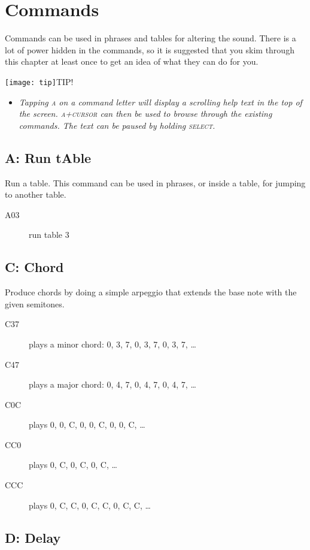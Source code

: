 \chapter{Commands}

Commands can be used in phrases and tables for altering the sound. There is a lot of power hidden in the commands, so it is suggested that you skim through this chapter at least once to get an idea of what they can do for you.

\texttt{[image: tip]}TIP!
\begin{itemize}
        \item \textit{Tapping \textsc{a} on a command letter will display a scrolling help text in the top of the screen. \textsc{a+cursor} can then be used to browse through the existing commands. The text can be paused by holding \textsc{select}.}
	\end{itemize}

\section{A: Run tAble}

Run a table. This command can be used in phrases, or inside a table, for jumping to another table.

\begin{description}
\item[A03] run table 3
\end{description}

\section{C: Chord}
\label{command-chord}
Produce chords by doing a simple arpeggio that extends the base note with the given semitones.

\begin{description}
\item[C37] plays a minor chord: 0, 3, 7, 0, 3, 7, 0, 3, 7, \ldots
\item[C47] plays a major chord: 0, 4, 7, 0, 4, 7, 0, 4, 7, \ldots
\item[C0C] plays 0, 0, C, 0, 0, C, 0, 0, C, \ldots
\item[CC0] plays 0, C, 0, C, 0, C, \ldots
\item[CCC] plays 0, C, C, 0, C, C, 0, C, C, \ldots
\end{description}

\section{D: Delay}

